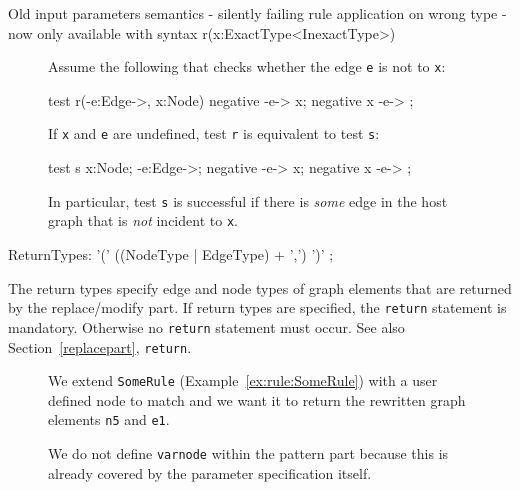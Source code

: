 Old input parameters semantics - silently failing rule application on wrong type -
now only available with syntax r(x:ExactType<InexactType>)

\begin{figure}[htbp]
\begin{example}
Assume the following  that checks whether the edge \texttt{e} is not  to \texttt{x}:
\begin{grgen}
test r(-e:Edge->, x:Node) {
  negative {
    -e-> x;
  }
  negative {
    x -e-> ;
  }
}
\end{grgen}
If \texttt{x} and \texttt{e} are undefined, test \texttt{r} is equivalent to test \texttt{s}:
\begin{grgen}
test s {
  x:Node;
  -e:Edge->;
  negative {
    -e-> x;
  }
  negative {
    x -e-> ;
  }
}
\end{grgen}
In particular, test \texttt{s} is successful if there is \emph{some} edge in the host graph that is \emph{not} incident to \texttt{x}.
\end{example}
\end{figure}

\begin{rail}
  ReturnTypes: '(' ((NodeType | EdgeType) + ',') ')' ;
\end{rail}
The return types specify edge and node types of graph elements that are returned by the replace/modify part. If return types are specified, the \texttt{return} statement is mandatory. Otherwise no \texttt{return} statement must occur. See also Section~\ref{replacepart}, \texttt{return}.
\begin{figure}[htbp]
\begin{example}\label{ex:rule:someruleext}
We extend \texttt{SomeRule} (Example~\ref{ex:rule:SomeRule}) with a user defined node to match and we want it to return the rewritten graph elements \texttt{n5} and \texttt{e1}.
\begin{grgen}
  rule SomeRuleExt(varnode:Node):(Node, EdgeTypeB) {
    n1:NodeTypeA;
    ...
    
    replace {
      varnode;
      ...  
      return(n5, e1);
      eval {
        ...
\end{grgen}
We do not define \texttt{varnode} within the pattern part because this is already covered by the parameter specification itself.
\end{example}
\end{figure}

